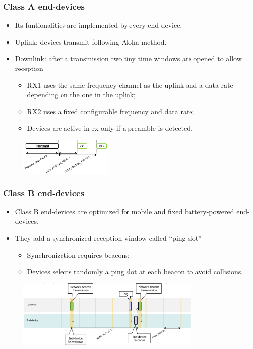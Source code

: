 \begin{frame}[fragile]
  \frametitle{Class A end-devices}
  \begin{itemize}
    \item Its funtionalities are implemented by every end-device.
    \item Uplink: devices transmit following Aloha method.
    \item Downlink: after a transmission two tiny time windows are opened to allow reception
    \begin{itemize}
      \item RX1 uses the same frequency channel as the uplink and a data rate depending on the one in the uplink;
      \item RX2 uses a fixed configurable frequency and data rate;
      \item Devices are active in rx only if a preamble is detected.
    \end{itemize}
  \end{itemize}
  \begin{figure}
		\centering
		\includegraphics[width=0.4\textwidth]{img/lora_rx_windows.png}
  \end{figure}
\end{frame}

\begin{frame}[fragile]
  \frametitle{Class B end-devices}
  \begin{itemize}
		\item Class B end-devices are optimized for mobile and fixed battery-powered end-devices.
		\item They add a synchronized reception window called ``ping slot''
		\begin{itemize}
			\item Synchronization requires beacons;
			\item Devices selects randomly a ping slot at each beacon to avoid collisions.
		\end{itemize}
	\end{itemize}
	\begin{figure}
		\centering
		\includegraphics[width=0.8\textwidth]{img/loraBeacon.png}
	\end{figure}
\end{frame}

